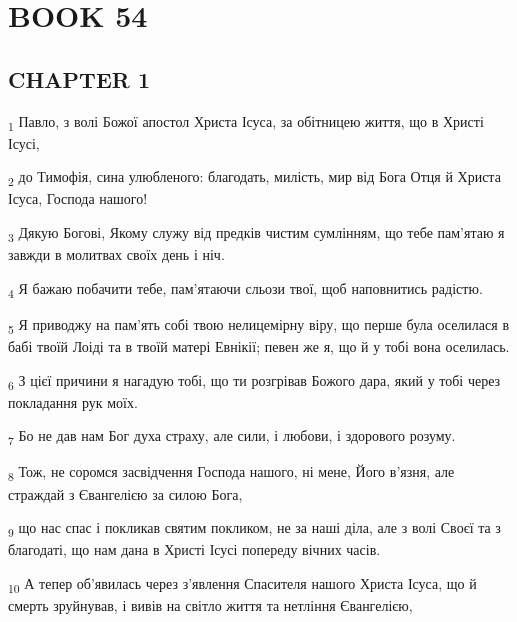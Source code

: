 \section{BOOK 54}
\subsection{CHAPTER 1}
\begin{tcolorbox}
\textsubscript{1} Павло, з волі Божої апостол Христа Ісуса, за обітницею життя, що в Христі Ісусі,
\end{tcolorbox}
\begin{tcolorbox}
\textsubscript{2} до Тимофія, сина улюбленого: благодать, милість, мир від Бога Отця й Христа Ісуса, Господа нашого!
\end{tcolorbox}
\begin{tcolorbox}
\textsubscript{3} Дякую Богові, Якому служу від предків чистим сумлінням, що тебе пам'ятаю я завжди в молитвах своїх день і ніч.
\end{tcolorbox}
\begin{tcolorbox}
\textsubscript{4} Я бажаю побачити тебе, пам'ятаючи сльози твої, щоб наповнитись радістю.
\end{tcolorbox}
\begin{tcolorbox}
\textsubscript{5} Я приводжу на пам'ять собі твою нелицемірну віру, що перше була оселилася в бабі твоїй Лоіді та в твоїй матері Евнікії; певен же я, що й у тобі вона оселилась.
\end{tcolorbox}
\begin{tcolorbox}
\textsubscript{6} З цієї причини я нагадую тобі, що ти розгрівав Божого дара, який у тобі через покладання рук моїх.
\end{tcolorbox}
\begin{tcolorbox}
\textsubscript{7} Бо не дав нам Бог духа страху, але сили, і любови, і здорового розуму.
\end{tcolorbox}
\begin{tcolorbox}
\textsubscript{8} Тож, не соромся засвідчення Господа нашого, ні мене, Його в'язня, але страждай з Євангелією за силою Бога,
\end{tcolorbox}
\begin{tcolorbox}
\textsubscript{9} що нас спас і покликав святим покликом, не за наші діла, але з волі Своєї та з благодаті, що нам дана в Христі Ісусі попереду вічних часів.
\end{tcolorbox}
\begin{tcolorbox}
\textsubscript{10} А тепер об'явилась через з'явлення Спасителя нашого Христа Ісуса, що й смерть зруйнував, і вивів на світло життя та нетління Євангелією,
\end{tcolorbox}
